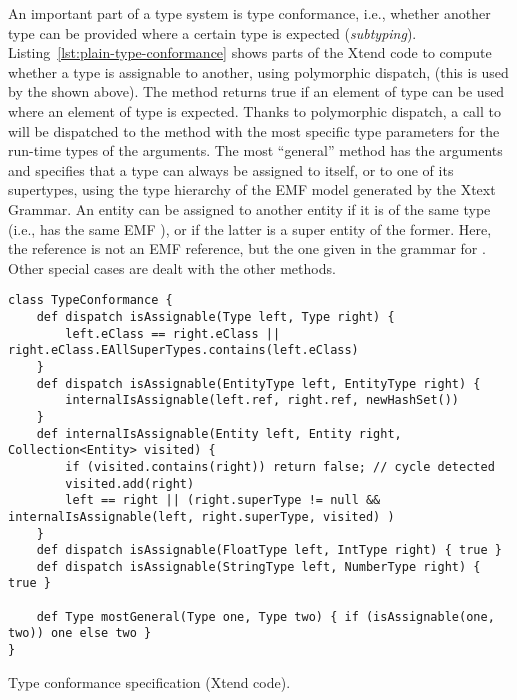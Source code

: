 An important part of a type system is type conformance, i.e., whether another
type can be provided where a certain type is expected (\emph{subtyping}).
Listing~\ref{lst:plain-type-conformance} shows parts of the Xtend code to
compute whether a type is assignable to another, using polymorphic dispatch, (this is used by
the  shown above).
The method
 returns true if an element of type 
can be used where an element of type  is expected.
Thanks to polymorphic dispatch, a call to  will be
dispatched to the method with the most specific type parameters for the run-time
types of the arguments. The most ``general'' method has the arguments
 and specifies that a type can always be assigned to itself,
or to one of its supertypes, using the type hierarchy of the EMF model generated
by the Xtext Grammar.
An entity can be assigned to another entity if it is of the same type (i.e., has
the same EMF ), or if the latter is a super entity of the former.
Here, the reference  is not an EMF reference, but the one given
in the grammar for . Other special cases are dealt with the
other methods. 

\begin{listing}[tb]
\begin{lstlisting}[language=xtend] 
class TypeConformance {
	def dispatch isAssignable(Type left, Type right) {
		left.eClass == right.eClass || right.eClass.EAllSuperTypes.contains(left.eClass) 
	}
	def dispatch isAssignable(EntityType left, EntityType right) {
		internalIsAssignable(left.ref, right.ref, newHashSet())
	}
	def internalIsAssignable(Entity left, Entity right, Collection<Entity> visited) {
		if (visited.contains(right)) return false; // cycle detected
		visited.add(right)
		left == right || (right.superType != null && internalIsAssignable(left, right.superType, visited) )
	}
	def dispatch isAssignable(FloatType left, IntType right) { true }
	def dispatch isAssignable(StringType left, NumberType right) { true }

	def Type mostGeneral(Type one, Type two) { if (isAssignable(one, two)) one else two }
}
\end{lstlisting}
\caption{Type conformance specification (Xtend code).}
\label{lst:plain-type-conformance}
\end{listing}

